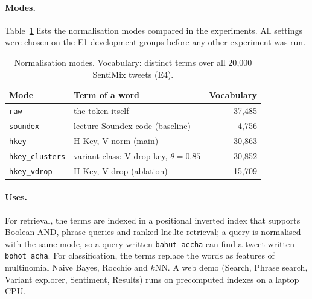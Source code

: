 \paragraph{Modes.} Table~\ref{tab:modes} lists the normalisation modes compared in the experiments.
All settings were chosen on the E1 development groups before any other experiment was run.

\begin{table}[t]
\centering
\caption{Normalisation modes. Vocabulary: distinct terms over all 20{,}000 SentiMix tweets (E4).}
\label{tab:modes}
\small
\begin{tabular}{@{}llr@{}}
\toprule
Mode & Term of a word & Vocabulary \\
\midrule
\texttt{raw} & the token itself & 37{,}485 \\
\texttt{soundex} & lecture Soundex code (baseline) & 4{,}756 \\
\texttt{hkey} & H-Key, V-norm (main) & 30{,}863 \\
\texttt{hkey\_clusters} & variant class: V-drop key, $\theta=0.85$ & 30{,}852 \\
\texttt{hkey\_vdrop} & H-Key, V-drop (ablation) & 15{,}709 \\
\bottomrule
\end{tabular}
\end{table}

\paragraph{Uses.} For retrieval, the terms are indexed in a positional inverted index that supports
Boolean AND, phrase queries and ranked lnc.ltc retrieval; a query is normalised with the same mode,
so a query written \texttt{bahut accha} can find a tweet written \texttt{bohot acha}. For
classification, the terms replace the words as features of multinomial Naive Bayes, Rocchio and
$k$NN. A web demo (Search, Phrase search, Variant explorer, Sentiment, Results) runs on precomputed
indexes on a laptop CPU.
